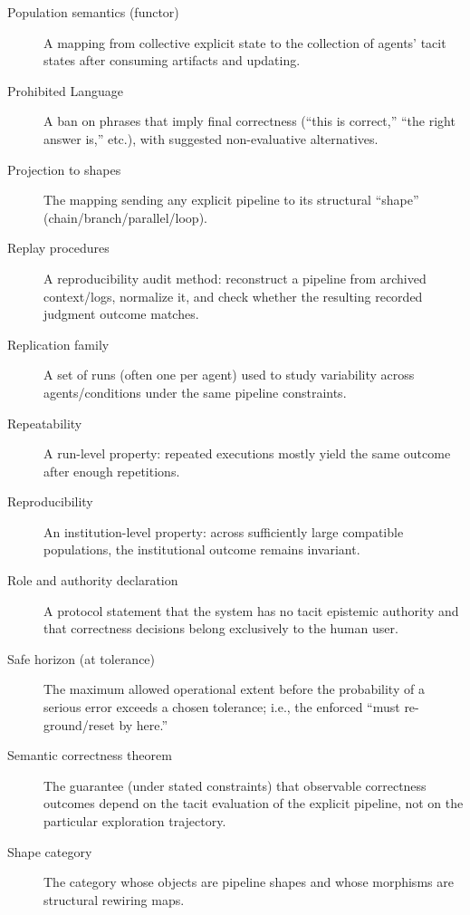 \begin{description}
\item[Population semantics (functor)] A mapping from collective explicit state to the collection of agents’ tacit states after consuming artifacts and updating.

\item[Prohibited Language] A ban on phrases that imply final correctness (“this is correct,” “the right answer is,” etc.), with suggested non-evaluative alternatives.

\item[Projection to shapes] The mapping sending any explicit pipeline to its structural “shape” (chain/branch/parallel/loop).

\item[Replay procedures] A reproducibility audit method: reconstruct a pipeline from archived context/logs, normalize it, and check whether the resulting recorded judgment outcome matches.

\item[Replication family] A set of runs (often one per agent) used to study variability across agents/conditions under the same pipeline constraints.

\item[Repeatability] A run-level property: repeated executions mostly yield the same outcome after enough repetitions.

\item[Reproducibility] An institution-level property: across sufficiently large compatible populations, the institutional outcome remains invariant.

\item[Role and authority declaration] A protocol statement that the system has no tacit epistemic authority and that correctness decisions belong exclusively to the human user.

\item[Safe horizon (at tolerance)] The maximum allowed operational extent before the probability of a serious error exceeds a chosen tolerance; i.e., the enforced “must re-ground/reset by here.”

\item[Semantic correctness theorem] The guarantee (under stated constraints) that observable correctness outcomes depend on the tacit evaluation of the explicit pipeline, not on the particular exploration trajectory.

\item[Shape category] The category whose objects are pipeline shapes and whose morphisms are structural rewiring maps.


\end{description}
